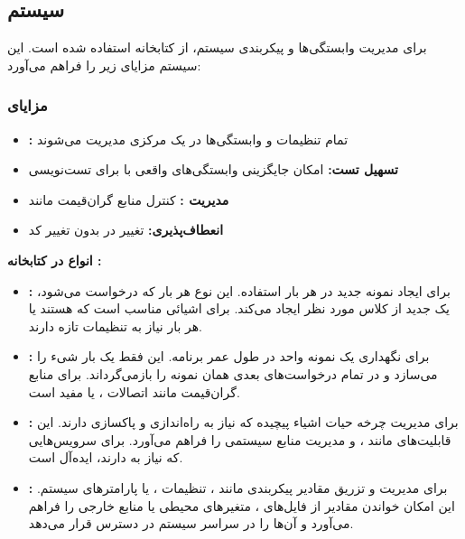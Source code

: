 \subsection{سیستم }

برای مدیریت وابستگی‌ها و پیکربندی سیستم، از کتابخانه  استفاده شده است. این سیستم مزایای زیر را فراهم می‌آورد:

\subsubsection{مزایای }

\begin{itemize}
    \item \textbf{:} تمام تنظیمات و وابستگی‌ها در یک  مرکزی مدیریت می‌شوند
    \item \textbf{تسهیل تست:} امکان جایگزینی وابستگی‌های واقعی با  برای تست‌نویسی
    \item \textbf{مدیریت :} کنترل  منابع گران‌قیمت مانند 
    \item \textbf{انعطاف‌پذیری:} تغییر  در  بدون تغییر کد
\end{itemize}

\noindent
\textbf{انواع  در کتابخانه :}
\begin{itemize}
    \item \textbf{:} برای ایجاد نمونه جدید در هر بار استفاده. این نوع  هر بار که درخواست می‌شود، یک  جدید از کلاس مورد نظر ایجاد می‌کند. برای اشیائی مناسب است که  هستند یا هر بار نیاز به تنظیمات تازه دارند.
    
    \item \textbf{:} برای نگهداری یک نمونه واحد در طول عمر برنامه. این  فقط یک بار شیء را می‌سازد و در تمام درخواست‌های بعدی همان نمونه را بازمی‌گرداند. برای منابع گران‌قیمت مانند اتصالات ،  یا  مفید است.
    
    \item \textbf{:} برای مدیریت چرخه حیات اشیاء پیچیده که نیاز به راه‌اندازی و پاکسازی دارند. این  قابلیت‌های  مانند ،  و مدیریت منابع سیستمی را فراهم می‌آورد. برای سرویس‌هایی که نیاز به  دارند، ایده‌آل است.
    
    \item \textbf{:} برای مدیریت و تزریق مقادیر پیکربندی مانند ، تنظیمات ، یا پارامترهای سیستم. این  امکان خواندن مقادیر از فایل‌های ، متغیرهای محیطی یا منابع خارجی را فراهم می‌آورد و آن‌ها را در سراسر سیستم در دسترس قرار می‌دهد.
\end{itemize}

